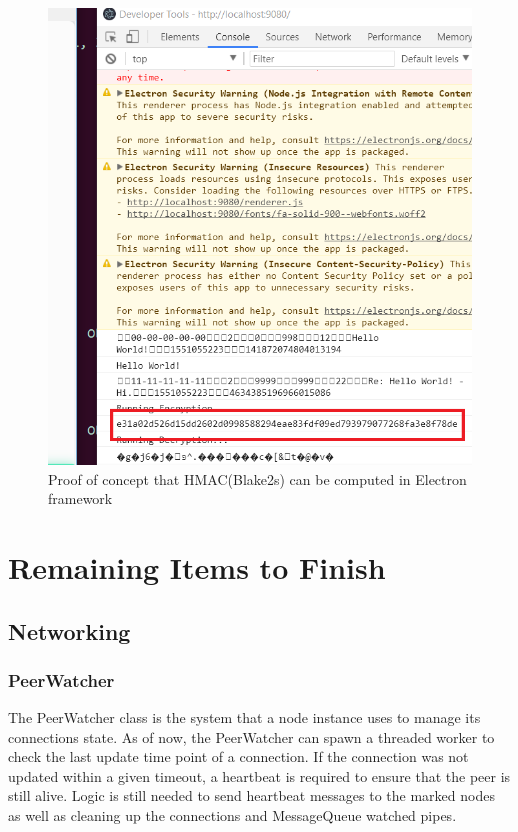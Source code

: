 \documentclass[tikz,a4paper,titlepage]{article}
\begin{document}
\begin{figure}[H]
  \centering
    \includegraphics[scale=1]{electron-enc1.png}
    \caption{Proof of concept that HMAC(Blake2s) can be computed in Electron framework}
\end{figure}


\section{Remaining Items to Finish}
\subsection{Networking}
\subsubsection{PeerWatcher}
The PeerWatcher class is the system that a node instance uses to manage its connections state. As of now, the PeerWatcher can spawn a threaded worker to check the last update time point of a connection. If the connection was not updated within a given timeout, a heartbeat is required to ensure that the peer is still alive. Logic is still needed to send heartbeat messages to the marked nodes as well as cleaning up the connections and MessageQueue watched pipes. 
\end{document}
